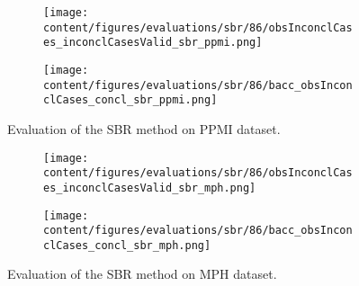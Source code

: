 


\begin{figure}[t]
  \begin{subfigure}{0.9\textwidth}
    \centering
    \texttt{[image: content/figures/evaluations/sbr/86/obsInconclCases\_inconclCasesValid\_sbr\_ppmi.png]}
    \label{fig:obsInconclCases_inconclCasesValid_sbr_ppmi}
  \end{subfigure}
  \hfill
  \begin{subfigure}{0.9\textwidth}
    \centering
    \texttt{[image: content/figures/evaluations/sbr/86/bacc\_obsInconclCases\_concl\_sbr\_ppmi.png]}
    \label{fig:bacc_obsInconclCases_concl_sbr_ppmi}
  \end{subfigure}
  \caption{Evaluation of the SBR method on PPMI dataset.}
\end{figure}





\begin{figure}[t]
  \begin{subfigure}{0.9\textwidth}
    \centering
    \texttt{[image: content/figures/evaluations/sbr/86/obsInconclCases\_inconclCasesValid\_sbr\_mph.png]}
    \label{fig:obsInconclCases_inconclCasesValid_sbr_mph}
  \end{subfigure}
  \hfill
  \begin{subfigure}{0.9\textwidth}
    \centering
    \texttt{[image: content/figures/evaluations/sbr/86/bacc\_obsInconclCases\_concl\_sbr\_mph.png]}
    \label{fig:bacc_obsInconclCases_concl_sbr_mph}
  \end{subfigure}
  \caption{Evaluation of the SBR method on MPH dataset.}
\end{figure}



